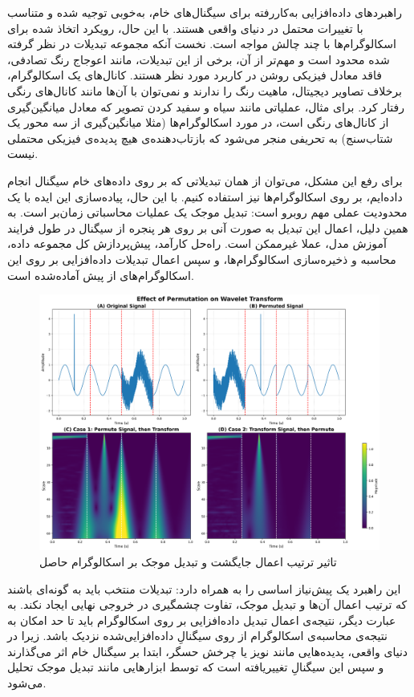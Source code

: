 راهبردهای داده‌افزایی به‌کاررفته برای سیگنال‌های خام، به‌خوبی توجیه شده و متناسب با تغییرات محتمل در دنیای واقعی هستند. با این حال، رویکرد اتخاذ شده برای اسکالوگرام‌ها با چند چالش مواجه است. نخست آنکه مجموعه تبدیلات در نظر گرفته شده محدود است و مهم‌تر از آن، برخی از این تبدیلات، مانند اعوجاج رنگ تصادفی، فاقد معادل فیزیکی روشن در کاربرد مورد نظر هستند. کانال‌های یک اسکالوگرام، برخلاف تصاویر دیجیتال، ماهیت رنگ را ندارند و نمی‌توان با آن‌ها مانند کانال‌های رنگی رفتار کرد. برای مثال، عملیاتی مانند سیاه و سفید کردن تصویر که معادل میانگین‌گیری از کانال‌های رنگی است، در مورد اسکالوگرام‌ها (مثلا میانگین‌گیری از سه محور یک شتاب‌سنج) به تحریفی منجر می‌شود که بازتاب‌دهنده‌ی هیچ پدیده‌ی فیزیکی محتملی نیست.

برای رفع این مشکل، می‌توان از همان تبدیلاتی که بر روی داده‌های خام سیگنال انجام داده‌ایم، بر روی اسکالوگرام‌ها نیز استفاده کنیم. با این حال، پیاده‌سازی این ایده با یک محدودیت عملی مهم روبرو است: تبدیل موجک یک عملیات محاسباتی زمان‌بر است. به همین دلیل، اعمال این تبدیل به صورت آنی بر روی هر پنجره از سیگنال در طول فرایند آموزش مدل، عملا غیرممکن است. راه‌حل کارآمد، پیش‌پردازش کل مجموعه داده، محاسبه و ذخیره‌سازی اسکالوگرام‌ها، و سپس اعمال تبدیلات داده‌افزایی بر روی این اسکالوگرام‌های از پیش آماده‌شده است.

\begin{figure}[h!]
\centering
\includegraphics[width=1\textwidth]{Images/Chapter3/wavelet-permutation.png}
\caption{تاثیر ترتیب اعمال جایگشت و تبدیل موجک بر اسکالوگرام حاصل}
\label{fig:wavelet-permutation}
\end{figure}

این راهبرد یک پیش‌نیاز اساسی را به همراه دارد: تبدیلات منتخب باید به گونه‌ای باشند که ترتیب اعمال آن‌ها و تبدیل موجک، تفاوت چشمگیری در خروجی نهایی ایجاد نکند. به عبارت دیگر، نتیجه‌ی اعمال تبدیل داده‌افزایی بر روی اسکالوگرام باید تا حد امکان به نتیجه‌ی محاسبه‌ی اسکالوگرام از روی سیگنالِ داده‌افزایی‌شده نزدیک باشد. زیرا در دنیای واقعی، پدیده‌هایی مانند نویز یا چرخش حسگر، ابتدا بر سیگنال خام اثر می‌گذارند و سپس این سیگنالِ تغییریافته است که توسط ابزارهایی مانند تبدیل موجک تحلیل می‌شود.

